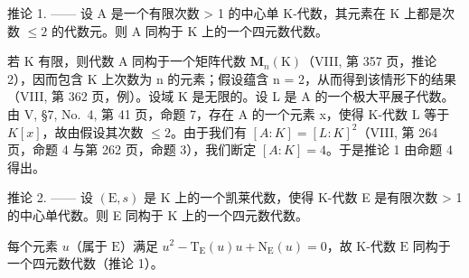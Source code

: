 推论 1. —— 设 A 是一个有限次数 \textgreater{} 1 的中心单 K-代数，其元素在 K 上都是次数 \(\leqslant 2\) 的代数元。则 A 同构于 K 上的一个四元数代数。

若 K 有限，则代数 A 同构于一个矩阵代数 \(\mathbf{M}_{n}(\mathrm{K})\)（VIII, 第 357 页，推论 2），因而包含 K 上次数为 n 的元素；假设蕴含 n = 2，从而得到该情形下的结果（VIII, 第 362 页，例）。设域 K 是无限的。设 L 是 A 的一个极大平展子代数。由 V, §7, No.~4, 第 41 页，命题 7，存在 A 的一个元素 x，使得 K-代数 L 等于 \(K[x]\)，故由假设其次数 \(\leqslant 2\)。由于我们有 \([A : K] = [L : K]^{2}\)（VIII, 第 264 页，命题 4 与第 262 页，命题 3），我们断定 \([A : K] = 4\)。于是推论 1 由命题 4 得出。

推论 2. —— 设 \((\mathrm{E}, s)\) 是 K 上的一个凯莱代数，使得 K-代数 E 是有限次数 \textgreater{} 1 的中心单代数。则 E 同构于 K 上的一个四元数代数。

每个元素 \(u\)（属于 \(\mathrm{E}\)）满足 \(u^2 - \mathrm{T}_{\mathrm{E}}(u)u + \mathrm{N}_{\mathrm{E}}(u) = 0\)，故 K-代数 \(\mathrm{E}\) 同构于一个四元数代数（推论 1）。

